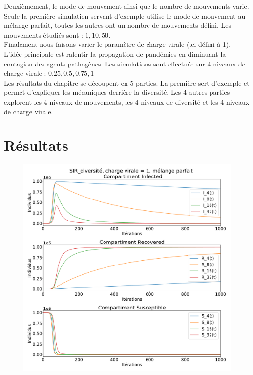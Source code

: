 Deuxièmement, le mode de mouvement ainsi que le nombre de mouvements varie. Seule la première simulation servant d'exemple utilise le mode de mouvement au mélange parfait, toutes les autres ont un nombre de mouvements défini. Les mouvements étudiés sont : $1,10,50$.\\

Finalement nous faisons varier le paramètre de charge virale (ici défini à 1). L'idée principale est ralentir la propagation de pandémies en diminuant la contagion des agents pathogènes. Les simulations sont effectuée sur $4$ niveaux de charge virale : $0.25,0.5,0.75,1$\\

Les résultats du chapitre se découpent en $5$ parties. La première sert d'exemple et permet d'expliquer les mécaniques derrière la diversité. Les $4$ autres parties explorent les $4$ niveaux de mouvements, les $4$ niveaux de diversité et les $4$ niveaux de charge virale.

\section{Résultats}



\begin{figure}[h]
	\centering
	\captionsetup{justification=centering}
	\includegraphics[width=.7\textwidth]{Images/SIR_diversite_mix.pdf}
\end{figure}

\newpage


